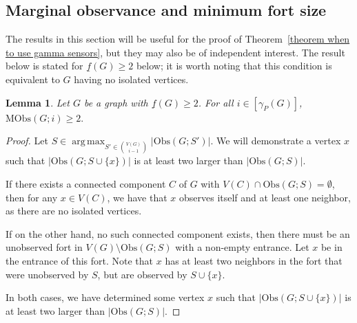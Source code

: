 \documentclass{article}
\newtheorem{lemma}[theorem]{Lemma}
\DeclareMathOperator*{\argmax}{arg\,max}
\begin{document}
    \subsection{Marginal observance and minimum fort size}
        The results in this section will be useful for the proof of Theorem~\ref{theorem when to use gamma sensors}, but they may also be of independent interest.
        The result below is stated for $\underline{f}(G)\geq 2$ below; it is worth noting that this condition is equivalent to $G$ having no isolated vertices.
        \begin{lemma}\label{lemma marginal observation with f=2}
            Let $G$ be a graph with $\underline{f}(G)\geq 2$. For all $i\in [\gamma_P(G)]$, 
                $ \mathrm{MObs}(G;i)\geq 2. $
        \end{lemma}
        \begin{proof}
            Let $S\in \displaystyle\argmax_{S'\in\binom{V(G)}{i-1}} |\mathrm{Obs}(G;S')|$.
            We will demonstrate a vertex $x$ such that $|\mathrm{Obs}(G;S\cup \{x\})|$ is at least two larger than $|\mathrm{Obs}(G;S)|$.
            
            If there exists a connected component $C$ of $G$ with $V(C)\cap \mathrm{Obs}(G;S)=\emptyset$, then for any $x\in V(C)$, we have that $x$ observes itself and at least one neighbor, as there are no isolated vertices.
            
            If on the other hand, no such connected component exists, then there must be an unobserved fort in $V(G)\setminus \mathrm{Obs}(G;S)$ with a non-empty entrance.
            Let $x$ be in the entrance of this fort.
            Note that $x$ has at least two neighbors in the fort that were unobserved by $S$, but are observed by $S\cup \{x\}$.

            In both cases, we have determined some vertex $x$ such that $|\mathrm{Obs}(G;S\cup \{x\})|$ is at least two larger than $|\mathrm{Obs}(G;S)|$.
        \end{proof}
        
\end{document}
